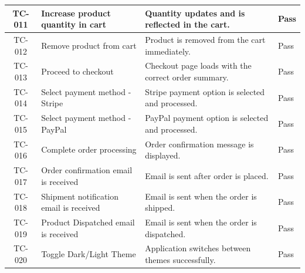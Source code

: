 \documentclass{llncs}
\begin{document}
\begin{longtable}{|c|>{\raggedright}p{4.8cm}|p{6cm}|>{\centering\arraybackslash}p{2cm}|}
    TC-011                & Increase product quantity in cart          & Quantity updates and is reflected in the cart.            &        Pass                 \\ \hline
    TC-012                & Remove product from cart                   & Product is removed from the cart immediately.             &        Pass                 \\ \hline
    TC-013                & Proceed to checkout                        & Checkout page loads with the correct order summary.       &        Pass                 \\ \hline
    TC-014                & Select payment method - Stripe             & Stripe payment option is selected and processed.          &        Pass                 \\ \hline
    TC-015                & Select payment method - PayPal             & PayPal payment option is selected and processed.          &        Pass                 \\ \hline
    TC-016                & Complete order processing                  & Order confirmation message is displayed.                  &        Pass                 \\ \hline
    TC-017                & Order confirmation email is received       & Email is sent after order is placed.                      &        Pass                 \\ \hline
    TC-018                & Shipment notification email is received    & Email is sent when the order is shipped.                  &        Pass                 \\ \hline
    TC-019                & Product Dispatched email is received       & Email is sent when the order is dispatched.               &        Pass                 \\ \hline
    TC-020                & Toggle Dark/Light Theme                    & Application switches between themes successfully.         &        Pass                 \\ \hline
\end{longtable}

\begin{center}
    \setcounter{table}{1} %
    \captionsetup{justification=centering} %
     \label{tab:functional-test-cases}
\end{center}

\vspace{5mm}  %
\end{document}
